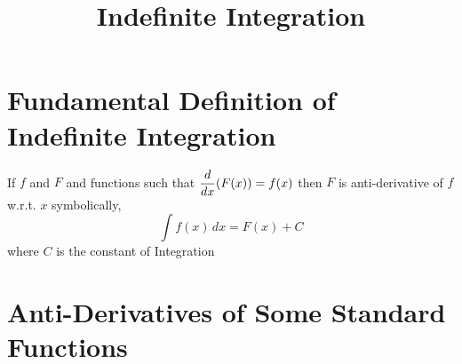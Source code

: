\documentclass{article}
\title{Indefinite Integration}
\author{}
\date{}
\begin{document}
\maketitle

\section{Fundamental Definition of \\ Indefinite Integration}
If $f$ and $F$ and functions such that $\displaystyle\dv{x}(F(x))=f(x)$ then $F$ is anti-derivative of $f$ w.r.t. $x$ symbolically, $$\displaystyle\int f(x) \,dx=F(x)+C$$
where $C$ is the constant of Integration

\section{Anti-Derivatives of Some Standard Functions}
\end{document}
